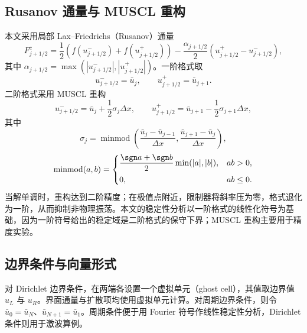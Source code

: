 \subsection{Rusanov 通量与 MUSCL 重构}

本文采用局部 Lax--Friedrichs（Rusanov）通量
\begin{equation}
  F^{c}_{j+1/2}
  =\frac12\left(f(u^-_{j+1/2})+f(u^+_{j+1/2})\right)
  -\frac{\alpha_{j+1/2}}{2}\left(u^+_{j+1/2}-u^-_{j+1/2}\right),
  \label{eq:rusanov-burgers}
\end{equation}
其中 $\alpha_{j+1/2}=\max(|u^-_{j+1/2}|,|u^+_{j+1/2}|)$。一阶格式取
\begin{equation}
  u^-_{j+1/2}=\bar u_j,\qquad u^+_{j+1/2}=\bar u_{j+1}.
  \label{eq:first-order-states}
\end{equation}
二阶格式采用 MUSCL 重构
\begin{equation}
  u^-_{j+1/2}=\bar u_j+\frac12\sigma_j\Delta x,\qquad
  u^+_{j+1/2}=\bar u_{j+1}-\frac12\sigma_{j+1}\Delta x,
  \label{eq:muscl-burgers}
\end{equation}
其中
\begin{equation}
  \sigma_j=\operatorname{minmod}\left(
  \frac{\bar u_j-\bar u_{j-1}}{\Delta x},
  \frac{\bar u_{j+1}-\bar u_j}{\Delta x}\right),
  \label{eq:minmod-burgers}
\end{equation}
\begin{equation}
  \operatorname{minmod}(a,b)=
  \begin{cases}
    \dfrac{\sgn a+\sgn b}{2}\min(|a|,|b|), & ab>0,\\[6pt]
    0, & ab\le0.
  \end{cases}
  \label{eq:minmod-burgers-def}
\end{equation}
当解单调时，重构达到二阶精度；在极值点附近，限制器将斜率压为零，格式退化为一阶，从而抑制非物理振荡。本文的稳定性分析以一阶格式的线性化符号为基础，因为一阶符号给出的稳定域是二阶格式的保守下界；MUSCL 重构主要用于精度实验。

\subsection{边界条件与向量形式}

对 Dirichlet 边界条件，在两端各设置一个虚拟单元（ghost cell），其值取边界值 $u_L$ 与 $u_R$。界面通量与扩散项均使用虚拟单元计算。对周期边界条件，则令 $\bar u_0=\bar u_N$、$\bar u_{N+1}=\bar u_1$。周期条件便于用 Fourier 符号作线性稳定性分析，Dirichlet 条件则用于激波算例。

